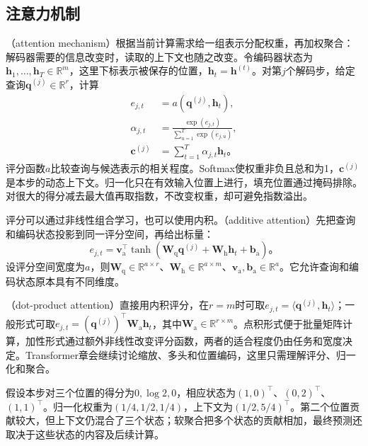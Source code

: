 \subsection{注意力机制}
\label{sec:rnn-attention-mechanism}

（attention mechanism）根据当前计算需求给一组表示分配权重，再加权聚合：解码器需要的信息改变时，读取的上下文也随之改变。令编码器状态为$\bm{h}_1,\ldots,\bm{h}_T\in\mathbb{R}^{m}$，这里下标表示被保存的位置，$\bm{h}_t=\bm{h}^{(t)}$。对第$j$个解码步，给定查询$\bm{q}^{(j)}\in\mathbb{R}^{r}$，计算
\begin{equation}
  \begin{aligned}
    e_{j,t}&=a(\bm{q}^{(j)},\bm{h}_t),\\
    \alpha_{j,t}&=\frac{\exp(e_{j,t})}
       {\sum_{u=1}^{T}\exp(e_{j,u})},\\
    \bm{c}^{(j)}&=\sum_{t=1}^{T}\alpha_{j,t}\bm{h}_t\text{。}
  \end{aligned}
  \label{eq:rnn-attention}
\end{equation}
评分函数$a$比较查询与候选表示的相关程度。Softmax使权重非负且总和为1，$\bm{c}^{(j)}$是本步的动态上下文。归一化只在有效输入位置上进行，填充位置通过掩码排除。对很大的得分减去最大值再取指数，不改变权重，却可避免指数溢出。

评分可以通过非线性组合学习，也可以使用内积。（additive attention）先把查询和编码状态投影到同一评分空间，再给出标量：
\begin{equation}
  e_{j,t}=\bm{v}_{\mathrm{a}}^{\top}\tanh\!\left(
     \bm{W}_{\mathrm{q}}\bm{q}^{(j)}
     +\bm{W}_{\mathrm{h}}\bm{h}_t+\bm{b}_{\mathrm{a}}\right)\text{。}
  \label{eq:rnn-additive-attention}
\end{equation}
设评分空间宽度为$a$，则$\bm{W}_{\mathrm{q}}\in\mathbb{R}^{a\times r}$、$\bm{W}_{\mathrm{h}}\in\mathbb{R}^{a\times m}$、$\bm{v}_{\mathrm{a}},\bm{b}_{\mathrm{a}}\in\mathbb{R}^{a}$。它允许查询和编码状态原本具有不同维度。

（dot-product attention）直接用内积评分，在$r=m$时可取$e_{j,t}=\langle\bm{q}^{(j)},\bm{h}_t\rangle$；一般形式可取$e_{j,t}=(\bm{q}^{(j)})^{\top}\bm{W}_{\mathrm{a}}\bm{h}_t$，其中$\bm{W}_{\mathrm{a}}\in\mathbb{R}^{r\times m}$。点积形式便于批量矩阵计算，加性形式通过额外非线性改变评分函数，两者的适合程度仍由任务和宽度决定。Transformer章会继续讨论缩放、多头和位置编码，这里只需理解评分、归一化和聚合。

\begin{example}[权重与上下文]
  \label{ex:rnn-attention-context}
  假设本步对三个位置的得分为$0,\log2,0$，相应状态为$(1,0)^{\top}$、$(0,2)^{\top}$、$(1,1)^{\top}$。归一化权重为$(1/4,1/2,1/4)$，上下文为$(1/2,5/4)^{\top}$。第二个位置贡献较大，但上下文仍混合了三个状态；软聚合把多个状态的贡献相加，最终预测还取决于这些状态的内容及后续计算。
\end{example}


